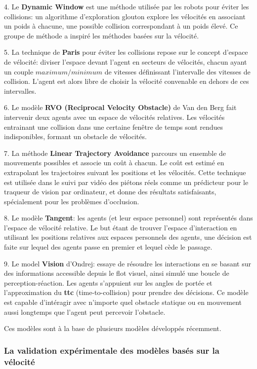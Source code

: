 \documentclass[11pt]{article}
\begin{document}
4. Le \textbf{Dynamic Window} est une méthode utilisée par les robots pour éviter les collisions: un algorithme d'exploration glouton explore les vélocités en associant un poids à chacune, une possible collision correspondant à un poids élevé. Ce groupe de méthode a inspiré les méthodes basées sur la vélocité.

5. La technique de \textbf{Paris} pour éviter les collisions repose sur le concept d'espace de vélocité: diviser l'espace devant l'agent en secteurs de vélocités, chacun ayant un couple $maximum/minimum$ de vitesses définissant l'intervalle des vitesses de collision. L'agent est alors libre de choisir la vélocité convenable en dehors de ces intervalles.

6. Le modèle \textbf{RVO (Reciprocal Velocity Obstacle)} de Van den Berg fait intervenir deux agents avec un espace de vélocités relatives. Les vélocités entrainant une collision dans une certaine fenêtre de temps sont rendues indisponibles, formant un obstacle de vélocités.

7. La méthode \textbf{Linear Trajectory Avoidance} parcours un ensemble de mouvements possibles et associe un coût à chacun. Le coût est estimé en extrapolant les trajectoires suivant les positions et les vélocités. Cette technique est utilisée dans le suivi par vidéo des piétons réels comme un prédicteur pour le traqueur de vision par ordinateur, et donne des résultats satisfaisants, spécialement pour les problèmes d'occlusion.

8. Le modèle \textbf{Tangent}: les agents (et leur espace personnel) sont représentés dans l'espace de vélocité relative. Le but étant de trouver l'espace d'interaction en utilisant les positions relatives aux espaces personnels des agents, une décision est faite sur lequel des agents passe en premier et lequel cède le passage.

9. Le model \textbf{Vision} d'Ondrej: essaye de résoudre les interactions en se basant sur des informations accessible depuis le flot visuel, ainsi simulé une boucle de perception-réaction. Les agents s'appuient sur les angles de portée et l'approximation du \textbf{ttc} (time-to-collision) pour prendre des décisions. Ce modèle est capable d'intéragir avec n'importe quel obstacle statique ou en mouvement aussi longtemps que l'agent peut percevoir l'obstacle.

Ces modèles sont à la base de plusieurs modèles développés récemment.

\subsubsection*{La validation expérimentale des modèles basés sur la vélocité}
\end{document}
